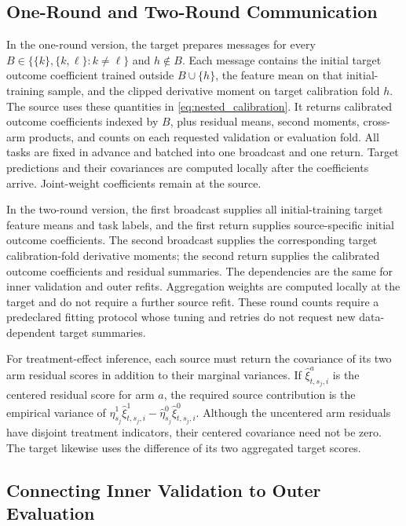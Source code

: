\documentclass[12pt]{article}
\begin{document}
\subsection{One-Round and Two-Round Communication}\label{supp:expanded_two_round}
In the one-round version, the target prepares messages for every $B\in\{\{k\},\{k,\ell\}:k\ne\ell\}$ and $h\notin B$. Each message contains the initial target outcome coefficient trained outside $B\cup\{h\}$, the feature mean on that initial-training sample, and the clipped derivative moment on target calibration fold $h$. The source uses these quantities in \cref{eq:nested_calibration}. It returns calibrated outcome coefficients indexed by $B$, plus residual means, second moments, cross-arm products, and counts on each requested validation or evaluation fold. All tasks are fixed in advance and batched into one broadcast and one return. Target predictions and their covariances are computed locally after the coefficients arrive. Joint-weight coefficients remain at the source.

In the two-round version, the first broadcast supplies all initial-training target feature means and task labels, and the first return supplies source-specific initial outcome coefficients. The second broadcast supplies the corresponding target calibration-fold derivative moments; the second return supplies the calibrated outcome coefficients and residual summaries. The dependencies are the same for inner validation and outer refits. Aggregation weights are computed locally at the target and do not require a further source refit. These round counts require a predeclared fitting protocol whose tuning and retries do not request new data-dependent target summaries.

For treatment-effect inference, each source must return the covariance of its two arm residual scores in addition to their marginal variances. If $\widehat\xi_{t,s_j,i}^a$ is the centered residual score for arm $a$, the required source contribution is the empirical variance of $\widehat\eta_{s_j}^1\widehat\xi_{t,s_j,i}^1-\widehat\eta_{s_j}^0\widehat\xi_{t,s_j,i}^0$. Although the uncentered arm residuals have disjoint treatment indicators, their centered covariance need not be zero. The target likewise uses the difference of its two aggregated target scores.

\subsection{Connecting Inner Validation to Outer Evaluation}\label{supp:nested_validation}
\end{document}
